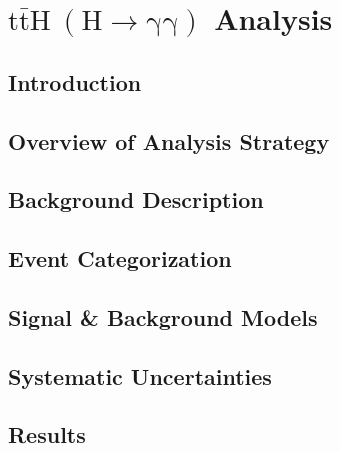 \chapter{$\mathrm{t\bar{t}H~(H \to \gamma \gamma)}$ Analysis}

\section{Introduction} \label{sec:tth_intro}


\section{Overview of Analysis Strategy} \label{sec:tth_analysis_strategy}


\section{Background Description} \label{sec:tth_background_description}

\section{Event Categorization} \label{sec:tth_event_categorization}

\section{Signal \& Background Models} \label{sec:sig_bkg_models}

\section{Systematic Uncertainties} \label{sec:tth_systematic_uncertainties}

\section{Results} \label{sec:tth_results}
